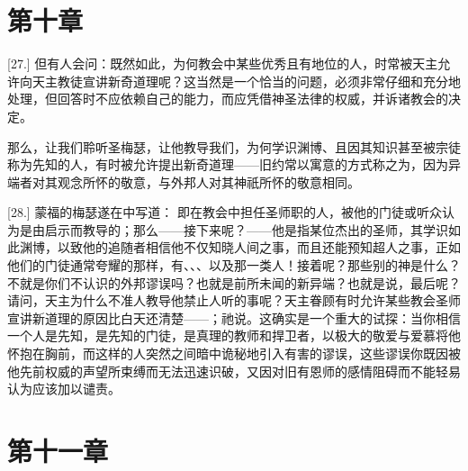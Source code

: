 
\section{第十章}

\par

[27.] 但有人会问：既然如此，为何教会中某些优秀且有地位的人，时常被天主允许向天主教徒宣讲新奇道理呢？这当然是一个恰当的问题，必须非常仔细和充分地处理，但回答时不应依赖自己的能力，而应凭借神圣法律的权威，并诉诸教会的决定。\par

那么，让我们聆听圣梅瑟，让他教导我们，为何学识渊博、且因其知识甚至被宗徒称为先知的人，有时被允许提出新奇道理——旧约常以寓意的方式称之为，因为异端者对其观念所怀的敬意，与外邦人对其神祇所怀的敬意相同。\par

[28.] 蒙福的梅瑟遂在中写道： 即在教会中担任圣师职的人，被他的门徒或听众认为是由启示而教导的；那么——接下来呢？——他是指某位杰出的圣师，其学识如此渊博，以致他的追随者相信他不仅知晓人间之事，而且还能预知超人之事，正如他们的门徒通常夸耀的那样，有、、、以及那一类人！接着呢？那些别的神是什么？不就是你们不认识的外邦谬误吗？也就是前所未闻的新异端？也就是说，最后呢？请问，天主为什么不准人教导他禁止人听的事呢？天主眷顾有时允许某些教会圣师宣讲新道理的原因比白天还清楚——；祂说。这确实是一个重大的试探：当你相信一个人是先知，是先知的门徒，是真理的教师和捍卫者，以极大的敬爱与爱慕将他怀抱在胸前，而这样的人突然之间暗中诡秘地引入有害的谬误，这些谬误你既因被他先前权威的声望所束缚而无法迅速识破，又因对旧有恩师的感情阻碍而不能轻易认为应该加以谴责。\par


\section{第十一章}

